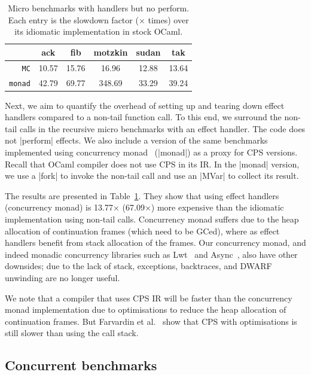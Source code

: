 \documentclass[sigplan,10pt,review,anonymous]{acmart}\settopmatter{printfolios=true,printccs=false,printacmref=false}
\begin{document}
\begin{table}
\caption{Micro benchmarks with handlers but no perform. Each entry is the
	slowdown factor ($\times$ times) over its idiomatic implementation in stock OCaml.}
\vspace{-3mm}
{
\begin{tabular}{r c c c c c}
	& \textbf{ack} & \textbf{fib} & \textbf{motzkin} & \textbf{sudan} & \textbf{tak} \\ \hline
	\texttt{MC} 	 	& 10.57 & 15.76 & 16.96 & 12.88 & 13.64 \\
	\texttt{monad} 	& 42.79 & 69.77 & 348.69 & 33.29 & 39.24 \\ \hline
\end{tabular}
}
\label{tab:micro_noperform}
	\vspace{-4mm}
\end{table}

Next, we aim to quantify the overhead of setting up and tearing down effect
handlers compared to a non-tail function call. To this end, we surround the
non-tail calls in the recursive micro benchmarks with an effect handler. The
code does not |perform| effects. We also include a version of the same
benchmarks implemented using concurrency monad~\cite{Claessen99} (|monad|) as a
proxy for CPS versions. Recall that OCaml compiler does not use CPS in its IR.
In the |monad| version, we use a |fork| to invoke the non-tail call and use an
|MVar| to collect its result.

The results are presented in Table~\ref{tab:micro_noperform}. They show that
using effect handlers (concurrency monad) is 13.77$\times$ (67.09$\times$) more
expensive than the idiomatic implementation using non-tail calls. Concurrency
monad suffers due to the heap allocation of continuation frames (which need to
be GCed), where as effect handlers benefit from stack allocation of the frames.
Our concurrency monad, and indeed monadic concurrency libraries such as
Lwt~\cite{lwt} and Async~\cite{async}, also have other downsides; due to the
lack of stack, exceptions, backtraces, and DWARF unwinding are no longer
useful.

We note that a compiler that uses CPS IR will be faster than the concurrency
monad implementation due to optimisations to reduce the heap allocation of
continuation frames. But Farvardin et al.~\cite{Farvardin20} show that CPS with
optimisations is still slower than using the call stack.

\vspace{-3mm}
\subsection{Concurrent benchmarks}
\end{document}
